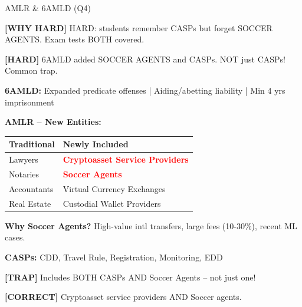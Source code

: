\documentclass[6pt,aspectratio=169,fontsize=5pt]{beamer}
\renewcommand{\tiny}{\fontsize{3.5pt}{4.5pt}\selectfont}
\renewcommand{\normalsize}{\fontsize{7.5pt}{8.5pt}\selectfont}
\newcommand{\trap}[1]{%
	\begin{block}{\textcolor{redtrap}{\textbf{[TRAP]}}}
		\textcolor{redtrap}{\tiny #1}
	\end{block}
}
\newcommand{\correct}[1]{%
	\begin{block}{\textcolor{greencorrect}{\textbf{[CORRECT]}}}
		\textcolor{greencorrect}{\tiny #1}
	\end{block}
}
\newcommand{\hard}[1]{%
	\begin{block}{\textcolor{hardcolor}{\textbf{[HARD]}}}
		\textcolor{hardcolor}{\tiny #1}
	\end{block}
}
\newcommand{\hardexplain}[1]{%
	\begin{block}{\textcolor{orangehard}{\textbf{[WHY HARD]}}}
		\textcolor{orangehard}{\tiny #1}
	\end{block}
}
\begin{document}
	\begin{frame}{\normalsize AMLR \& 6AMLD (Q4)}
		
		\hardexplain{HARD: students remember CASPs but forget SOCCER AGENTS. Exam tests BOTH covered.}
		
		\hard{6AMLD added SOCCER AGENTS and CASPs. NOT just CASPs! Common trap.}
		
		\textbf{6AMLD:} Expanded predicate offenses | Aiding/abetting liability | Min 4 yrs imprisonment
		
		\textbf{AMLR -- New Entities:}
		\begin{table}
			\begin{tabular}{|p{3.5cm}|p{3.5cm}|}
				\hline
				\textbf{Traditional} & \textbf{Newly Included} \\
				\hline
				Lawyers & \textcolor{red}{\textbf{Cryptoasset Service Providers}} \\
				\hline
				Notaries & \textcolor{red}{\textbf{Soccer Agents}} \\
				\hline
				Accountants & Virtual Currency Exchanges \\
				\hline
				Real Estate & Custodial Wallet Providers \\
				\hline
			\end{tabular}
		\end{table}
		
		\textbf{Why Soccer Agents?} High-value intl transfers, large fees (10-30\%), recent ML cases.
		
		\textbf{CASPs:} CDD, Travel Rule, Registration, Monitoring, EDD
		
		\trap{Includes BOTH CASPs AND Soccer Agents -- not just one!}
		
		\correct{Cryptoasset service providers AND Soccer agents.}
	\end{frame}
	
\end{document}
